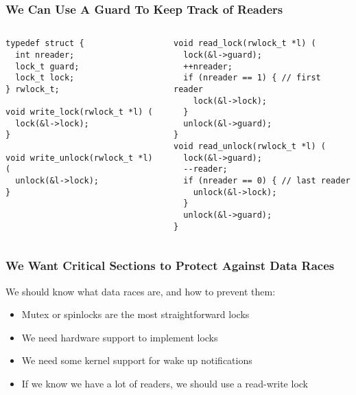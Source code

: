   \begin{frame}[fragile]
    \frametitle{We Can Use A Guard To Keep Track of Readers}

    \begin{columns}
      \begin{column}{0.5\textwidth}
        \begin{lstlisting}
typedef struct {
  int nreader;
  lock_t guard;
  lock_t lock;
} rwlock_t;

void write_lock(rwlock_t *l) (
  lock(&l->lock);
}

void write_unlock(rwlock_t *l) (
  unlock(&l->lock);
}
        \end{lstlisting}
      \end{column}
      \begin{column}{0.5\textwidth}
        \begin{lstlisting}
void read_lock(rwlock_t *l) (
  lock(&l->guard);
  ++nreader;
  if (nreader == 1) { // first reader
    lock(&l->lock);
  }
  unlock(&l->guard);
}
void read_unlock(rwlock_t *l) (
  lock(&l->guard);
  --reader;
  if (nreader == 0) { // last reader
    unlock(&l->lock);
  }
  unlock(&l->guard);
}
        \end{lstlisting}
      \end{column}
    \end{columns}
  \end{frame}

  \begin{frame}
    \frametitle{We Want Critical Sections to Protect Against Data Races}

    We should know what data races are, and how to prevent them:
    \begin{itemize}
      \item Mutex or spinlocks are the most straightforward locks
      \item We need hardware support to implement locks
      \item We need some kernel support for wake up notifications
      \item If we know we have a lot of readers, we should use a read-write lock
    \end{itemize}
  \end{frame}

